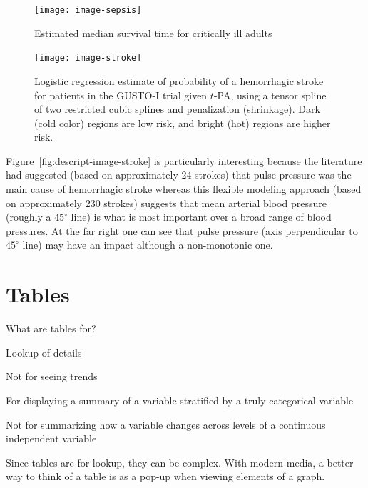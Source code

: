\begin{figure}[!htbp]\leavevmode%
 \centerline{\texttt{[image: image-sepsis]}}
 \caption{Estimated median survival time for critically ill adults}
 \end{figure}

\begin{figure}[!htbp]\leavevmode%
 \centerline{\texttt{[image: image-stroke]}}
 \caption[Probability of hemorrhagic stroke vs.\ blood
 pressures]{Logistic regression estimate of probability of a
   hemorrhagic stroke for patients in the GUSTO-I trial given $t$-PA,
   using a tensor spline of two restricted cubic splines and
   penalization (shrinkage).  Dark (cold color) regions are low risk,
   and bright (hot) regions are higher risk.}
 \end{figure}
 
 Figure~\ref{fig:descript-image-stroke} is particularly interesting
 because the literature had suggested (based on approximately 24
 strokes) that pulse pressure was the main
 cause of hemorrhagic stroke whereas this flexible modeling approach
 (based on approximately 230 strokes)
 suggests that mean arterial blood pressure (roughly a $45^\circ$ line)
 is what is most important 
 over a broad range of blood pressures.  At the far right one can see
 that pulse pressure (axis perpendicular to $45^\circ$ line) may have
 an impact although a non-monotonic one.

\clearpage

\section{Tables} 
What are tables for?
\bi
\item Lookup of details
\item Not for seeing trends
\item For displaying a summary of a variable stratified by a truly
  categorical variable
\item Not for summarizing how a variable changes across levels of a
  continuous independent variable
\ei

Since tables are for lookup, they can be complex.  With modern media,
a better way to think of a table is as a pop-up when viewing elements
of a graph.

